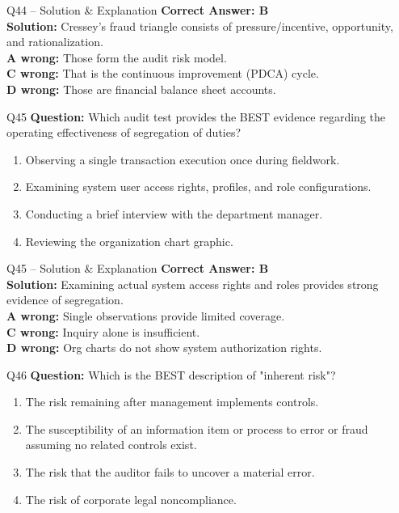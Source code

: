 \documentclass[aspectratio=169,10pt]{beamer}
\begin{document}
	\begin{frame}[t]{Q44 -- Solution \& Explanation}
		\small
		\textbf{Correct Answer: B} \\[4pt]
		\textbf{Solution:} Cressey's fraud triangle consists of pressure/incentive, opportunity, and rationalization. \\[4pt]
		\textbf{A wrong:} Those form the audit risk model. \\[2pt]
		\textbf{C wrong:} That is the continuous improvement (PDCA) cycle. \\[2pt]
		\textbf{D wrong:} Those are financial balance sheet accounts.
	\end{frame}
	
	\begin{frame}[t]{Q45}
		\small
		\textbf{Question:} Which audit test provides the BEST evidence regarding the operating effectiveness of segregation of duties?
		\begin{enumerate}[label=\Alph*.,itemsep=1pt,topsep=2pt]
			\item Observing a single transaction execution once during fieldwork.
			\item Examining system user access rights, profiles, and role configurations.
			\item Conducting a brief interview with the department manager.
			\item Reviewing the organization chart graphic.
		\end{enumerate}
	\end{frame}
	
	\begin{frame}[t]{Q45 -- Solution \& Explanation}
		\small
		\textbf{Correct Answer: B} \\[4pt]
		\textbf{Solution:} Examining actual system access rights and roles provides strong evidence of segregation. \\[4pt]
		\textbf{A wrong:} Single observations provide limited coverage. \\[2pt]
		\textbf{C wrong:} Inquiry alone is insufficient. \\[2pt]
		\textbf{D wrong:} Org charts do not show system authorization rights.
	\end{frame}
	
	\begin{frame}[t]{Q46}
		\small
		\textbf{Question:} Which is the BEST description of "inherent risk"?
		\begin{enumerate}[label=\Alph*.,itemsep=1pt,topsep=2pt]
			\item The risk remaining after management implements controls.
			\item The susceptibility of an information item or process to error or fraud assuming no related controls exist.
			\item The risk that the auditor fails to uncover a material error.
			\item The risk of corporate legal noncompliance.
		\end{enumerate}
	\end{frame}
	
\end{document}
